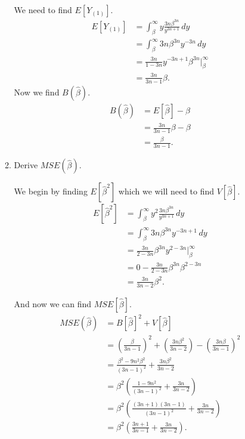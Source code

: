 \documentclass{article}
\begin{document}
\begin{enumerate}
\begin{enumerate}[label= (\alph*)]
        We need to find $E[Y_{(1)}]$.
        \begin{align*}
            E[Y_{(1)}]&=\int_{\beta}^{\infty} y\frac{3n\beta^{3n}}{y^{3n+1}} \, d y \\
            &=\int_{\beta}^{\infty} 3n\beta^{3n}y^{-3n} \, d y \\
            &= \frac{3n}{1-3n}y^{-3n+1}\beta^{3n} \Big|_{\beta}^{\infty}\\
            &= \frac{3n}{3n-1}\beta
        .\end{align*}
        Now we find $B(\hat{\beta})$.
            \begin{align*}
                B(\hat{\beta})&= E[\hat{\beta}]-{\beta}\\
                &=  \frac{3n}{3n-1}\beta- \beta\\
                &=\frac{\beta}{3n-1}
            .\end{align*}
        \item Derive $MSE(\hat{\beta})$.

            We begin by finding $E[\hat{\beta}^2]$ which we will need to find $V[\hat{\beta}]$.
        \begin{align*}
            E[\hat{\beta}^2]&=\int_{\beta}^{\infty} y^2\frac{3n\beta^{3n}}{y^{3n+1}} \, d y \\
            &=\int_{\beta}^{\infty} 3n\beta^{3n}y^{-3n+1} \, d y \\
            &= \frac{3n}{2-3n}\beta^{3n}y^{2-3n}\big|_{\beta}^{\infty} \\
            &= 0-\frac{3n}{2-3n}\beta^{3n}\beta^{2-3n} \\
            &= \frac{3n}{3n-2}\beta^2. 
        \end{align*}

        And now we can find $MSE[\hat{\beta}]$.
        \begin{align*}
            MSE(\hat{\beta})&= B[\hat{\beta}]^2+V[\hat{\beta}] \\
            &= \left( \frac{\beta}{3n-1} \right) ^2+\left( \frac{3n\beta^2}{3n-2} \right)-\left( \frac{3n\beta}{3n-1} \right)^2 \\
            &= \frac{\beta^2-9n^2\beta^2}{(3n-1)^2}+\frac{3n\beta^2}{3n-2} \\
            &= \beta^2\left( \frac{1-9n^2}{(3n-1)^2}+\frac{3n}{3n-2} \right)  \\
            &= \beta^2\left( \frac{(3n+1)(3n-1)}{(3n-1)^2} +\frac{3n}{3n-2}\right)  \\
            &= \beta^2\left( \frac{3n+1}{3n-1}+\frac{3n}{3n-2} \right) 
        .\end{align*}
\end{enumerate}


\end{enumerate}
\end{document}
